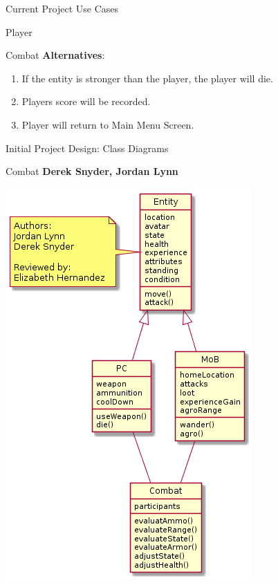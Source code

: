 \documentclass[12pt]{report}
\begin{document}
\begin{chapter}{Current Project Use Cases}
\begin{section}{Player}
\begin{subsection}{Combat}
      \textbf{Alternatives}:
      \begin{enumerate}
        \item If the entity is stronger than the player, the player will die.
        \item Players score will be recorded.
        \item Player will return to Main Menu Screen.
      \end{enumerate}
     \end{subsection}
    \end{section}
  \end{chapter}
  
  
  \begin{chapter}{Initial Project Design: Class Diagrams}
   \begin{section}{Combat}
   	\textbf{Derek Snyder, Jordan Lynn}
    	\centerline{\includegraphics[width=\textwidth,height=\textheight,keepaspectratio]{./images/combat.png}}


\end{section}
\end{chapter}
\end{document}
